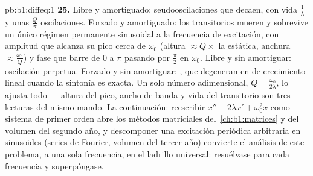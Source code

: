 \begin{solution}{pb:b1:diffeq:1}
\textbf{25.} Libre y amortiguado: seudooscilaciones que decaen, con
vida $\frac1\lambda$ y unas $\frac Q\pi$ oscilaciones. Forzado y
amortiguado: los transitorios mueren y sobrevive un único régimen
permanente sinusoidal a la frecuencia de excitación, con amplitud que
alcanza su pico cerca de $\omega_0$ (altura $\approx Q \times$ la
estática, anchura $\approx \frac{\omega_0}Q$) y fase que barre de $0$ a
$\pi$ pasando por $\frac\pi2$ en $\omega_0$. Libre y sin amortiguar:
oscilación perpetua. Forzado y sin amortiguar: , que
degeneran en  de crecimiento lineal cuando la sintonía es
exacta. Un solo número adimensional, $Q = \frac{\omega_0}{2\lambda}$,
lo ajusta todo --- altura del pico, ancho de banda y vida del
transitorio son tres lecturas del mismo mando. La continuación:
reescribir $x'' + 2\lambda x' + \omega_0^2x$ como sistema de primer
orden abre los métodos matriciales del~\cref{ch:b1:matrices} y del
volumen del segundo año, y descomponer una excitación periódica
arbitraria en sinusoides (series de Fourier, volumen del tercer año)
convierte el análisis de este problema, a una sola frecuencia, en el
ladrillo universal: resuélvase para cada frecuencia y superpóngase.
\end{solution}
